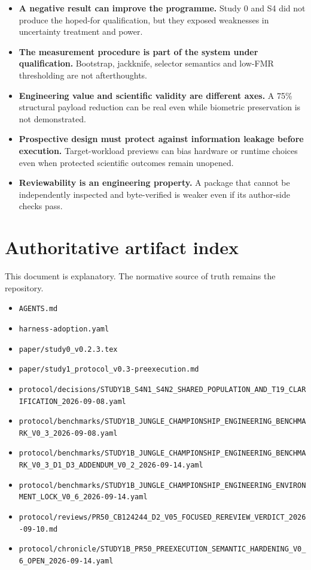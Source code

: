 \documentclass[10pt,a4paper]{article}
\newcommand{\code}[1]{\texttt{#1}}
\begin{document}
\begin{itemize}
\item \textbf{A negative result can improve the programme.} Study 0 and S4 did not produce the hoped-for qualification,
but they exposed weaknesses in uncertainty treatment and power.
\item \textbf{The measurement procedure is part of the system under qualification.} Bootstrap, jackknife, selector
semantics and low-FMR thresholding are not afterthoughts.
\item \textbf{Engineering value and scientific validity are different axes.} A 75\% structural payload reduction can be
real even while biometric preservation is not demonstrated.
\item \textbf{Prospective design must protect against information leakage before execution.} Target-workload previews can
bias hardware or runtime choices even when protected scientific outcomes remain unopened.
\item \textbf{Reviewability is an engineering property.} A package that cannot be independently inspected and byte-verified
is weaker even if its author-side checks pass.
\end{itemize}

\section{Authoritative artifact index}

This document is explanatory. The normative source of truth remains the repository.

\begin{itemize}
\item \code{AGENTS.md}
\item \code{harness-adoption.yaml}
\item \code{paper/study0\_v0.2.3.tex}
\item \code{paper/study1\_protocol\_v0.3-preexecution.md}
\item \code{protocol/decisions/STUDY1B\_S4N1\_S4N2\_SHARED\_POPULATION\_AND\_T19\_CLARIFICATION\_2026-09-08.yaml}
\item \code{protocol/benchmarks/STUDY1B\_JUNGLE\_CHAMPIONSHIP\_ENGINEERING\_BENCHMARK\_V0\_3\_2026-09-08.yaml}
\item \code{protocol/benchmarks/STUDY1B\_JUNGLE\_CHAMPIONSHIP\_ENGINEERING\_BENCHMARK\_V0\_3\_D1\_D3\_ADDENDUM\_V0\_2\_2026-09-14.yaml}
\item \code{protocol/benchmarks/STUDY1B\_JUNGLE\_CHAMPIONSHIP\_ENGINEERING\_ENVIRONMENT\_LOCK\_V0\_6\_2026-09-14.yaml}
\item \code{protocol/reviews/PR50\_CB124244\_D2\_V05\_FOCUSED\_REREVIEW\_VERDICT\_2026-09-10.md}
\item \code{protocol/chronicle/STUDY1B\_PR50\_PREEXECUTION\_SEMANTIC\_HARDENING\_V0\_6\_OPEN\_2026-09-14.yaml}
\end{itemize}
\end{document}

